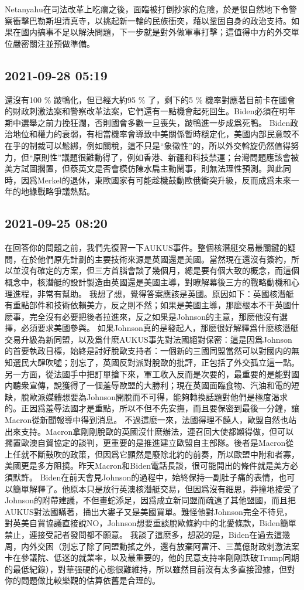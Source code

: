 \documentclass[twocolumn]{ctexart}
\begin{document}
Netanyahu在司法改革上吃癟之後，面臨被打倒抄家的危險，於是很自然地下令警察衝擊巴勒斯坦清真寺，以挑起新一輪的民族衝突，藉以鞏固自身的政治支持。如果在國内搞事不足以解決問題，下一步就是對外做軍事打擊；這值得中方的外交單位嚴密關注並預做準備。
\subsection*{2021-09-28 05:19}

還沒有100 \% 跛鴨化，但已經大約95 \% 了，剩下的5 \% 機率對應著目前卡在國會的財政刺激法案和警察改革法案，它們還有一點機會起死回生。Biden必須在明年期中選舉之前力挽狂瀾，否則國會多數一旦喪失，跛鴨進一步成爲死鴨。
Biden政治地位和權力的衰弱，有相當機率會導致中美關係暫時穩定化，美國内部民意較不在乎的制裁可以鬆綁，例如關稅，這不只是“象徵性”的，所以外交斡旋仍然值得努力，但“原則性”議題很難動得了，例如香港、新疆和科技禁運；台灣問題應該會被美方試圖擱置，但蔡英文是否會模仿陳水扁主動鬧事，則無法理性預測。與此同時，因爲Merkel的退休，東歐國家有可能趁機鼓動歐俄衝突升級，反而成爲未來一年的地緣戰略爭議熱點。
\subsection*{2021-09-25 08:20}

在回答你的問題之前，我們先復習一下AUKUS事件。整個核潛艇交易最關鍵的疑問，在於他們原先計劃的主要技術來源是英國還是美國。當然現在還沒有簽約，所以並沒有確定的方案，但三方首腦會談了幾個月，總是要有個大致的概念，而這個概念中，核潛艇的設計製造由英國還是美國主導，對瞭解幕後三方的戰略動機和心理進程，非常有幫助。
我想了想，覺得答案應該是英國。原因如下：英國核潛艇有重點部件和技術依賴美方，反之則不然；如果是美國主導，那麽根本不干英國什麽事，完全沒有必要把後者拉進來，反之如果是Johnson的主意，那麽他沒有選擇，必須要求美國參與。
如果Johnson真的是發起人，那麽很好解釋爲什麽核潛艇交易升級為新同盟，以及爲什麽AUKUS事先對法國絕對保密：這是因爲Johnson的首要執政目標，始終是討好脫歐支持者：一個新的三國同盟當然可以對國内的無知選民大肆吹噓；別忘了，英國反對派對脫歐的批評，正包括了外交孤立這一點。另一方面，從法國手中把訂單搶下來，軍工收入反而是次要的，最重要的是能對國内聽衆宣傳，說獲得了一個羞辱歐盟的大勝利；現在英國面臨食物、汽油和電的短缺，脫歐派媒體想要為Johnson開脫而不可得，能夠轉換話題對他們是極度渴求的。正因爲羞辱法國才是重點，所以不但不先安撫，而且要保密到最後一分鐘，讓Macron從新聞報導中得到消息。
不過這麽一來，法國得理不饒人，歐盟自然也站出來支持。Macron拿剛剛脫歐的英國沒什麽辦法，連召回大使都嬾得做，但可以擱置歐澳自貿協定的談判，更重要的是推進建立歐盟自主部隊。後者是Macron從上任就不斷鼓吹的政策，但因爲它顯然是廢除北約的前奏，所以歐盟中附和者寡，美國更是多方阻撓。昨天Macron和Biden電話長談，很可能開出的條件就是美方必須默許。
Biden在前天會見Johnson的過程中，始終保持一副肚子痛的表情，也可以簡單解釋了。他原本只是放行英澳核潛艇交易，但因爲沒有細思，莽撞地接受了Johnson的附帶建議，不但畫蛇添足，因爲成立新同盟而疏遠了其他盟國，而且把AUKUS對法國瞞著，捅出大婁子又是美國買單。難怪他對Johnson完全不待見，對英美自貿協議直接說NO，Johnson想要重談脫歐條約中的北愛條款，Biden簡單禁止，連接受記者發問都不願意。
我談了這麽多，想説的是，Biden在過去這幾周，内外交困（別忘了除了同盟動搖之外，還有放棄阿富汗、三萬億財政刺激法案卡在參議院、低迷的就業率，以及最重要的，他的民意支持率剛剛跌破Trump同期的最低紀錄），對華强硬的心態很難維持，所以雖然目前沒有太多直接證據，但對你的問題做比較樂觀的估算依舊是合理的。
\end{document}
